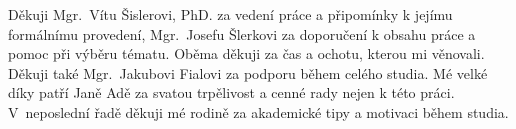 Děkuji Mgr.~Vítu Šislerovi, PhD. za vedení práce a připomínky k jejímu formálnímu provedení, Mgr.~Josefu Šlerkovi za doporučení k obsahu práce a pomoc při výběru tématu. Oběma děkuji za čas a ochotu, kterou mi věnovali. Děkuji také Mgr.~Jakubovi Fialovi za podporu během celého studia.
Mé velké díky patří Janě Adě za svatou trpělivost a cenné rady nejen k této práci.
V~neposlední řadě děkuji mé rodině za akademické tipy a motivaci během studia.